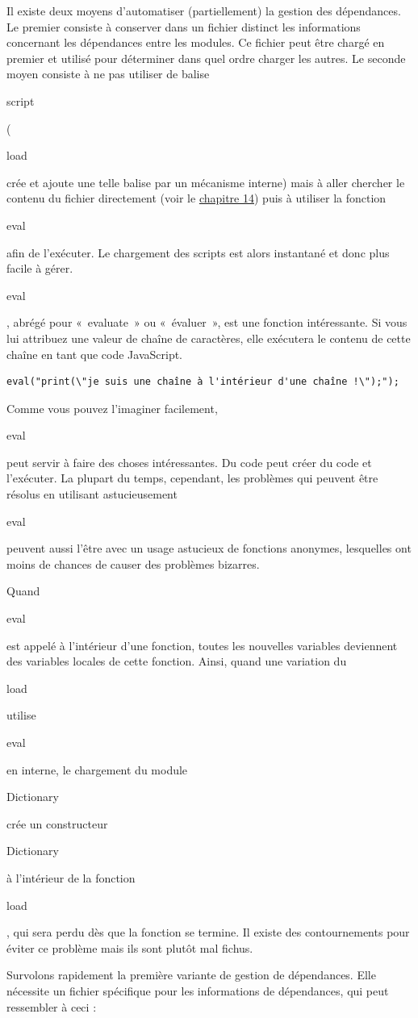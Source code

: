 \documentclass{FramateX}
\renewcommand{\texttt}[1]{\begin{sffamily}{#1}\end{sffamily}}
\begin{document}
\begin{center}\end{center}

Il existe deux moyens d'automatiser (partiellement) la gestion des
dépendances. Le premier consiste à conserver dans un fichier distinct
les informations concernant les dépendances entre les modules. Ce
fichier peut être chargé en premier et utilisé pour déterminer dans quel
ordre charger les autres. Le seconde moyen consiste à ne pas utiliser de
balise \texttt{script} (\texttt{load} crée et ajoute une telle balise
par un mécanisme interne) mais à aller chercher le contenu du fichier
directement (voir le \href{chapter14.html}{chapitre 14}) puis à utiliser
la fonction \texttt{eval} afin de l'exécuter. Le chargement des scripts
est alors instantané et donc plus facile à gérer.

\texttt{eval}, abrégé pour «~evaluate~» ou «~évaluer~», est une fonction
intéressante. Si vous lui attribuez une valeur de chaîne de caractères,
elle exécutera le contenu de cette chaîne en tant que code JavaScript.

\begin{lstlisting}
eval("print(\"je suis une chaîne à l'intérieur d'une chaîne !\");");
\end{lstlisting}
Comme vous pouvez l'imaginer facilement, \texttt{eval} peut servir à
faire des choses intéressantes. Du code peut créer du code et
l'exécuter. La plupart du temps, cependant, les problèmes qui peuvent
être résolus en utilisant astucieusement \texttt{eval} peuvent aussi
l'être avec un usage astucieux de fonctions anonymes, lesquelles ont
moins de chances de causer des problèmes bizarres.

Quand \texttt{eval} est appelé à l'intérieur d'une fonction, toutes les
nouvelles variables deviennent des variables locales de cette fonction.
Ainsi, quand une variation du \texttt{load} utilise \texttt{eval} en
interne, le chargement du module \texttt{Dictionary} crée un
constructeur \texttt{Dictionary} à l'intérieur de la fonction
\texttt{load}, qui sera perdu dès que la fonction se termine. Il existe
des contournements pour éviter ce problème mais ils sont plutôt mal
fichus.

\begin{center}\end{center}

Survolons rapidement la première variante de gestion de dépendances.
Elle nécessite un fichier spécifique pour les informations de
dépendances, qui peut ressembler à ceci :
\end{document}
